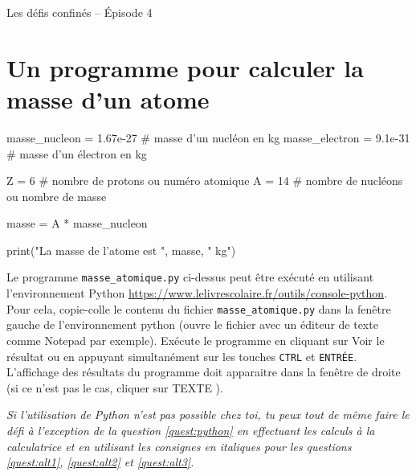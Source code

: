 \documentclass[12pt,a4paper]{article}
\begin{document}
\begin{header}
Les défis confinés -- Épisode 4
\end{header}

\section*{Un programme pour calculer la masse d'un atome}

\begin{pyverbatim}
masse_nucleon = 1.67e-27    # masse d'un nucléon en kg
masse_electron = 9.1e-31    # masse d'un électron en kg

Z = 6                       # nombre de protons ou numéro atomique
A = 14                      # nombre de nucléons ou nombre de masse

masse = A * masse_nucleon

print("La masse de l'atome est ", masse, " kg")
\end{pyverbatim}

Le programme \texttt{masse\_atomique.py} ci-dessus peut être exécuté en utilisant l'environnement Python \href{https://www.lelivrescolaire.fr/outils/console-python}{https://www.lelivrescolaire.fr/outils/console-python}.
Pour cela, copie-colle le contenu du fichier \texttt{masse\_atomique.py} dans la fenêtre gauche de l'environnement python (ouvre le fichier avec un éditeur de texte comme Notepad par exemple).
Exécute le programme en cliquant sur \og Voir le résultat \fg{} ou en appuyant simultanément sur les touches \texttt{CTRL} et \texttt{ENTRÉE}.
L'affichage des résultats du programme doit apparaitre dans la fenêtre de droite (si ce n'est pas le cas, cliquer sur \og TEXTE \fg{}).

\emph{Si l'utilisation de Python n'est pas possible chez toi, tu peux tout de même faire le défi à l'exception de la question \ref{quest:python} en effectuant les calculs à la calculatrice et en utilisant les consignes en italiques pour les questions \ref{quest:alt1}, \ref{quest:alt2} et \ref{quest:alt3}.}
\end{document}
